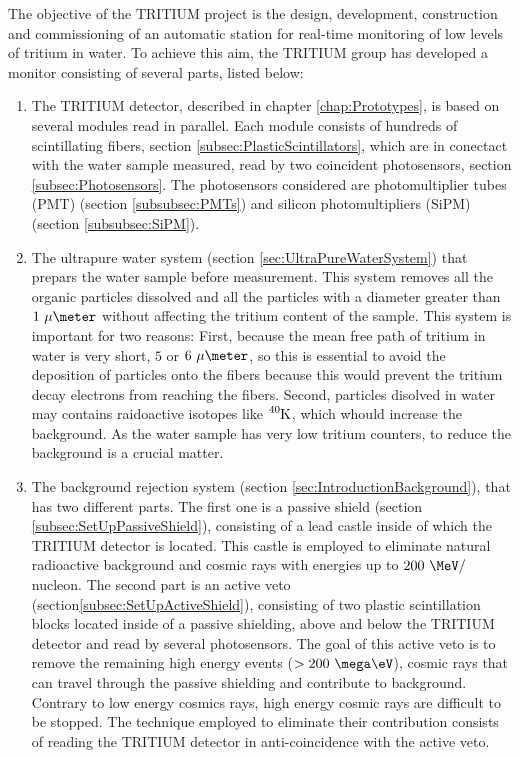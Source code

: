 The objective of the TRITIUM project is the design, development, construction and commissioning of an automatic station for real-time monitoring of low levels of tritium in water. To achieve this aim, the TRITIUM group has developed a monitor consisting of several parts, listed below: 

\begin{enumerate}

\item{} The TRITIUM detector, described in chapter \ref{chap:Prototypes}, is based on several modules read in parallel. Each module consists of hundreds of scintillating fibers, section \ref{subsec:PlasticScintillators}, which are in conectact with the water sample measured, read by two coincident photosensors, section \ref{subsec:Photosensors}. The photosensors considered are photomultiplier tubes (PMT) (section \ref{subsubsec:PMTs}) and silicon photomultipliers (SiPM) (section \ref{subsubsec:SiPM}).

\item{} The ultrapure water system (section \ref{sec:UltraPureWaterSystem}) that prepars the water sample before measurement. This system removes all the organic particles dissolved and all the particles with a diameter greater than $1~\mu\meter$ without affecting the tritium content of the sample. This system is important for two reasons: First, because the mean free path of tritium in water is very short, $5$ or $6~\mu\meter$,  so this is essential to avoid the deposition of particles onto the fibers because this would prevent the tritium decay electrons from reaching the fibers. Second, particles disolved in water may contains raidoactive isotopes like $\ce{^{40}K}$, which whould increase the background. As the water sample has very low tritium counters, to reduce the background is a crucial matter.

\item{} The background rejection system (section \ref{sec:IntroductionBackground}), that has two different parts. The first one is a passive shield (section \ref{subsec:SetUpPassiveShield}), consisting of a lead castle inside of which the TRITIUM detector is located. This castle is employed to eliminate natural radioactive background and cosmic rays with energies up to $200~\MeV/$nucleon. The second part is an active veto (section\ref{subsec:SetUpActiveShield}), consisting of two plastic scintillation blocks located inside of a passive shielding, above and below the TRITIUM detector and read by several photosensors. The goal of this active veto is to remove the remaining high energy events ($>200~\mega\eV$), cosmic rays that can travel through the passive shielding and contribute to background. Contrary to low energy cosmics rays, high energy cosmic rays are difficult to be stopped. The technique employed to eliminate their contribution consists of reading the TRITIUM detector in anti-coincidence with the active veto.


\end{enumerate}
